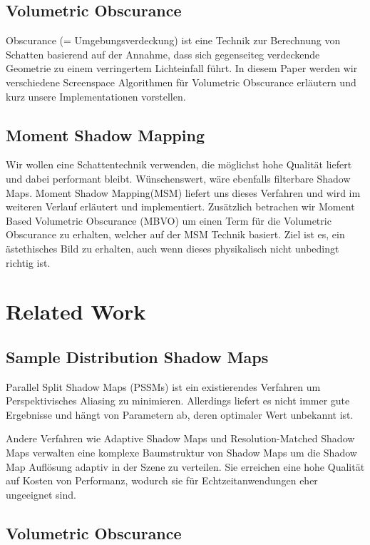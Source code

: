\documentclass[runningheaders,a4paper]{llncs}
\begin{document}
\subsection{Volumetric Obscurance}
Obscurance (= Umgebungsverdeckung) ist eine Technik zur Berechnung von Schatten basierend auf der Annahme,
dass sich gegenseiteg verdeckende Geometrie zu einem verringertem Lichteinfall führt. In diesem Paper werden
wir verschiedene Screenspace Algorithmen für Volumetric Obscurance erläutern und kurz unsere Implementationen vorstellen.


\subsection{Moment Shadow Mapping}
Wir wollen eine Schattentechnik verwenden, die möglichst hohe Qualität liefert und dabei performant bleibt. Wünschenswert, wäre ebenfalls filterbare Shadow Maps.
Moment Shadow Mapping(MSM) liefert uns dieses Verfahren und wird im weiteren Verlauf erläutert und implementiert. 
Zusätzlich betrachen wir Moment Based Volumetric Obscurance (MBVO) um einen Term für die Volumetric Obscurance zu erhalten, welcher auf der MSM Technik basiert. Ziel ist es, ein ästethisches Bild zu erhalten, auch wenn dieses physikalisch nicht unbedingt richtig ist.

\section{Related Work}

\subsection{Sample Distribution Shadow Maps}

Parallel Split Shadow Maps (PSSMs) \cite{pssm} ist ein existierendes Verfahren um Perspektivisches Aliasing zu minimieren.
Allerdings liefert es nicht immer gute Ergebnisse und hängt von Parametern ab, deren optimaler Wert unbekannt ist.

Andere Verfahren wie Adaptive Shadow Maps \cite{asm} und Resolution-Matched Shadow Maps \cite{rmsm} verwalten eine komplexe Baumstruktur von Shadow Maps um die Shadow Map Auflösung adaptiv in der Szene zu verteilen.
Sie erreichen eine hohe Qualität auf Kosten von Performanz, wodurch sie für Echtzeitanwendungen eher ungeeignet sind.


\subsection{Volumetric Obscurance}
\end{document}
